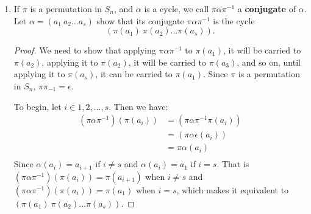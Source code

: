 \documentclass[12pt]{article}
\begin{document}
\begin{enumerate}
        

        \item If $\pi$ is a permutation in $S_n$, and $\alpha$ is a cycle, we call $\pi \alpha \pi^{-1}$ a \textbf{conjugate} of $\alpha$. Let $\alpha = (a_1\ a_2...a_s)$ show that its conjugate $\pi \alpha \pi^{-1}$ is the cycle
        \[(\pi(a_1)\ \pi(a_2)...\pi(a_s)).\]
        
        
        \begin{proof}
        	We need to show that applying $\pi \alpha \pi^{-1}$ to $\pi(a_1)$, it will be carried to $\pi(a_2)$, applying it to $\pi(a_2)$, it will be carried to $\pi(a_3)$, and so on, until applying it to $\pi(a_s)$, it can be carried to $\pi(a_1)$. Since $\pi$ is a permutation in $S_n$, $\pi \pi_{-1} = \epsilon$.
        	 
        	To begin, let $i \in {1,2,...,s}$. Then we have:
        	\begin{align*}
        		(\pi \alpha \pi^{-1})(\pi(a_i)) &=(\pi \alpha \pi^{-1}\pi(a_i))\\
        		&= (\pi \alpha \epsilon (a_i))\\
        		&= \pi \alpha(a_i) \\
        	\end{align*}
	        Since $\alpha (a_i)= a_{i+1} $ if $ i \neq s$ and $\alpha (a_i)= a_{1}$ if $i = s$. That is $	(\pi \alpha \pi^{-1})(\pi(a_i)) = \pi(a_{i+1})$ when $i \neq s$ and $(\pi \alpha \pi^{-1})(\pi(a_i)) = \pi(a_1)$ when $i = s$, which makes it equivalent to      $(\pi(a_1)\ \pi(a_2)...\pi(a_s)).$
        \end{proof}
 \end{enumerate}
\end{document}
